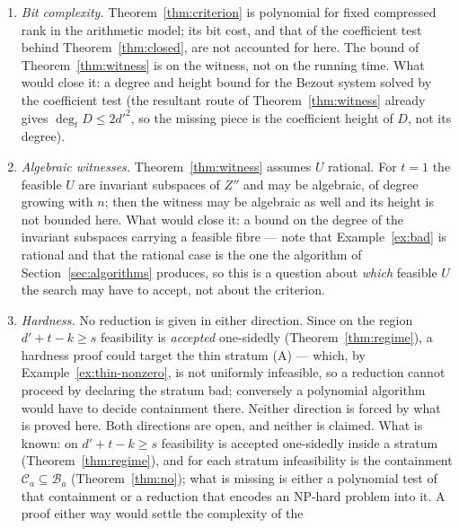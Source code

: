 \documentclass[journal]{IEEEtran}
\theoremstyle{plainn}
\theoremstyle{remark}
\begin{document}
\begin{enumerate}[label=(\Alph*),leftmargin=2.2em,itemsep=2pt]
\emph{What remains open.} A uniform procedure that decides whether $\mathcal C_a\setminus\mathcal
B_a$ is empty, or produces a feasible point when it is not, without enumerating the compatible
subspaces. The pointwise coefficient test of Proposition~\ref{prop:coeff} and the relative closedness
of Theorem~\ref{thm:closed} decide the question point by point but not by containment, and no
complexity bound is claimed.
\item \emph{Bit complexity.} Theorem~\ref{thm:criterion} is polynomial for fixed compressed rank in
the arithmetic model; its bit cost, and that of the coefficient test behind
Theorem~\ref{thm:closed}, are not accounted for here. The bound of Theorem~\ref{thm:witness} is on
the witness, not on the running time. What would close it: a degree and height bound for the Bezout
system solved by the coefficient test (the resultant route of Theorem~\ref{thm:witness} already gives
$\deg_t D\le2d'^{2}$, so the missing piece is the coefficient height of $D$, not its degree).
\item \emph{Algebraic witnesses.} Theorem~\ref{thm:witness} assumes $U$ rational. For $t=1$ the
feasible $U$ are invariant subspaces of $Z''$ and may be algebraic, of degree growing with $n$; then
the witness may be algebraic as well and its height is not bounded here. What would close it: a bound
on the degree of the invariant subspaces carrying a feasible fibre --- note that Example~\ref{ex:bad}
is rational and that the rational case is the one the algorithm of Section~\ref{sec:algorithms}
produces, so this is a question about \emph{which} feasible $U$ the search may have to accept, not
about the criterion.
\item \emph{Hardness.} No reduction is given in either direction. Since on the region
$d'+t-k\ge s$ feasibility is \emph{accepted} one-sidedly (Theorem~\ref{thm:regime}), a hardness proof
could target the thin stratum (A) --- which, by Example~\ref{ex:thin-nonzero}, is not uniformly
infeasible, so a reduction cannot proceed by declaring the stratum bad; conversely a polynomial
algorithm would have to decide containment there. Neither direction is forced by what is proved here. Both directions are open, and neither is
claimed. What is known: on $d'+t-k\ge s$ feasibility is accepted one-sidedly inside a stratum
(Theorem~\ref{thm:regime}), and for each stratum infeasibility is the containment $\mathcal C_a\subseteq
\mathcal B_a$ (Theorem~\ref{thm:no}); what is missing is either a polynomial test of that containment or a
reduction that encodes an NP-hard problem into it. A proof either way would settle the complexity of the

\end{enumerate}
\end{document}
